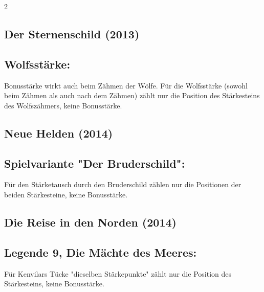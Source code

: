 \documentclass[10pt, a4paper, oneside]{book}
\begin{document}
\begin{multicols*}{2}
\begin{bgcolor}
\end{bgcolor}



\begin{bgcolor}
\section{Der Sternenschild (2013)}

\subsection{Wolfsstärke:}

Bonusstärke wirkt auch beim Zähmen der Wölfe. Für die Wolfsstärke (sowohl beim Zähmen als auch nach dem Zähmen) zählt nur die Position des Stärkesteins des Wolfszähmers, keine Bonusstärke.
\supercite{stsch-faq}

\end{bgcolor}



\begin{nobgcolor}

\section{Neue Helden (2014)}


\subsection{Spielvariante "Der Bruderschild":}

Für den Stärketausch durch den Bruderschild zählen nur die Positionen der beiden Stärkesteine, keine Bonusstärke.


\end{nobgcolor}


\begin{bgcolor}
\section{Die Reise in den Norden (2014)}

\subsection{Legende 9, Die Mächte des Meeres:}

Für Kenvilars Tücke "dieselben Stärkepunkte" zählt nur die Position des Stärkesteins, keine Bonusstärke.
\supercite{dridn9-kenvilars-tuecke}



\end{bgcolor}
\end{multicols*}
\end{document}
